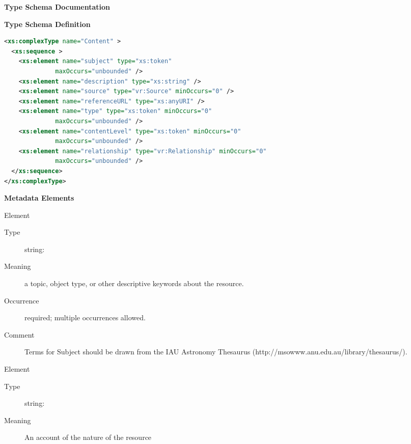 \documentclass[11pt,a4paper]{ivoa}
\begin{document}
\begin{generated}
\begingroup
      	\renewcommand*\descriptionlabel[1]{%
      	\hbox to 5.5em{\emph{#1}\hfil}}\vspace{2ex}\noindent\textbf{ Type Schema Documentation}


\vspace{1ex}\noindent\textbf{ Type Schema Definition}

\begin{lstlisting}[language=XML,basicstyle=\footnotesize]
<xs:complexType name="Content" >
  <xs:sequence >
    <xs:element name="subject" type="xs:token"
              maxOccurs="unbounded" />
    <xs:element name="description" type="xs:string" />
    <xs:element name="source" type="vr:Source" minOccurs="0" />
    <xs:element name="referenceURL" type="xs:anyURI" />
    <xs:element name="type" type="xs:token" minOccurs="0"
              maxOccurs="unbounded" />
    <xs:element name="contentLevel" type="xs:token" minOccurs="0"
              maxOccurs="unbounded" />
    <xs:element name="relationship" type="vr:Relationship" minOccurs="0"
              maxOccurs="unbounded" />
  </xs:sequence>
</xs:complexType>
\end{lstlisting}

\vspace{0.5ex}\noindent\textbf{ Metadata Elements}

\begingroup\small\begin{bigdescription}\item[Element \xmlel{subject}]
\begin{description}
\item[Type] string: 
\item[Meaning] 
               a topic, object type, or other descriptive keywords 
               about the resource.  
             
\item[Occurrence] required; multiple occurrences allowed.
\item[Comment] 
               Terms for Subject should be drawn from the IAU Astronomy 
               Thesaurus (http://msowww.anu.edu.au/library/thesaurus/).
             

\end{description}
\item[Element \xmlel{description}]
\begin{description}
\item[Type] string: 
\item[Meaning] 
               An account of the nature of the resource
             

\end{description}
\end{bigdescription}
\end{generated}
\end{document}
